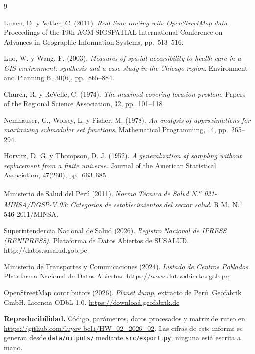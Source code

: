 \documentclass[10pt,a4paper]{article}
\begin{document}
\begin{thebibliography}{9}
\footnotesize

Luxen, D. y Vetter, C. (2011). \emph{Real-time routing with OpenStreetMap data}.
Proceedings of the 19th ACM SIGSPATIAL International Conference on Advances in
Geographic Information Systems, pp.\ 513--516.

Luo, W. y Wang, F. (2003). \emph{Measures of spatial accessibility to health
care in a GIS environment: synthesis and a case study in the Chicago region}.
Environment and Planning B, 30(6), pp.\ 865--884.

Church, R. y ReVelle, C. (1974). \emph{The maximal covering location problem}.
Papers of the Regional Science Association, 32, pp.\ 101--118.

Nemhauser, G., Wolsey, L. y Fisher, M. (1978). \emph{An analysis of
approximations for maximizing submodular set functions}. Mathematical
Programming, 14, pp.\ 265--294.

Horvitz, D. G. y Thompson, D. J. (1952). \emph{A generalization of sampling
without replacement from a finite universe}. Journal of the American Statistical
Association, 47(260), pp.\ 663--685.

Ministerio de Salud del Perú (2011). \emph{Norma Técnica de Salud
N.\textsuperscript{o} 021-MINSA/DGSP-V.03: Categorías de establecimientos del
sector salud}. R.M.\ N.\textsuperscript{o} 546-2011/MINSA.

Superintendencia Nacional de Salud (2026). \emph{Registro Nacional de IPRESS
(RENIPRESS)}. Plataforma de Datos Abiertos de SUSALUD.
\url{http://datos.susalud.gob.pe}

Ministerio de Transportes y Comunicaciones (2024). \emph{Listado de Centros
Poblados}. Plataforma Nacional de Datos Abiertos.
\url{https://www.datosabiertos.gob.pe}

OpenStreetMap contributors (2026). \emph{Planet dump}, extracto de Perú.
Geofabrik GmbH. Licencia ODbL 1.0. \url{https://download.geofabrik.de}

\end{thebibliography}

\vfill
\noindent\footnotesize
\textbf{Reproducibilidad.} Código, parámetros, datos procesados y matriz de
ruteo en \url{https://github.com/luyov-belli/HW_02_2026_02}. Las cifras de este
informe se generan desde \texttt{data/outputs/} mediante
\texttt{src/export.py}; ninguna está escrita a mano.
\end{document}

